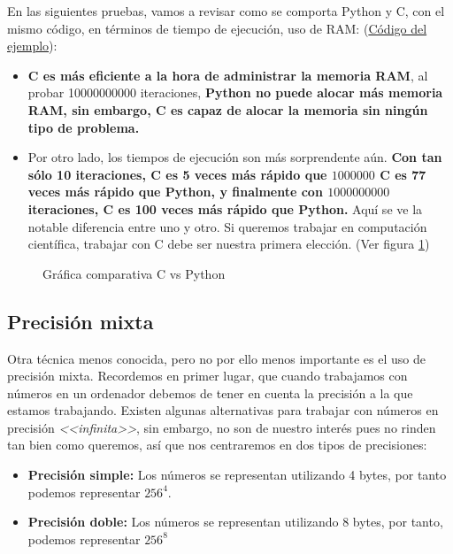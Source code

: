 En las siguientes pruebas, vamos a revisar como se comporta Python y C, con el mismo código, en términos de tiempo de ejecución, uso de RAM: (\hyperref[prueba:cvspython]{Código del ejemplo}):

\begin{itemize}
\item \textbf{C es más eficiente a la hora de administrar la memoria RAM}, al probar 10000000000 iteraciones, \textbf{Python no puede alocar más memoria RAM, sin embargo, C es capaz de alocar la memoria sin ningún tipo de problema.}
  
\item Por otro lado, los tiempos de ejecución son más sorprendente aún. \textbf{Con tan sólo 10 iteraciones, C es 5 veces más rápido que $1000000$ C es 77 veces más rápido que Python, y finalmente con $1000000000$ iteraciones, C es 100 veces más rápido que Python.} Aquí se ve la notable diferencia entre uno y otro. Si queremos trabajar en computación científica, trabajar con C debe ser nuestra primera elección. (Ver figura \ref{fig:cvspython})
\end{itemize}

\begin{figure}[h]
  \centering
  \caption{Gráfica comparativa C vs Python}
  \label{fig:cvspython}
\end{figure}

\subsection{Precisión mixta}
Otra técnica menos conocida, pero no por ello menos importante es el uso de precisión mixta. Recordemos en primer lugar, que cuando trabajamos con números en un ordenador debemos de tener en cuenta la precisión a la que estamos trabajando. Existen algunas alternativas para trabajar con números en precisión \textit{<<infinita>>}, sin embargo, no son de nuestro interés pues no rinden tan bien como queremos, así que nos centraremos en dos tipos de precisiones:

\begin{itemize}
\item \textbf{Precisión simple: } Los números se representan utilizando 4 bytes, por tanto podemos representar $256^4$.
  
\item \textbf{Precisión doble: } Los números se representan utilizando 8 bytes, por tanto, podemos representar $256^8$
\end{itemize}

